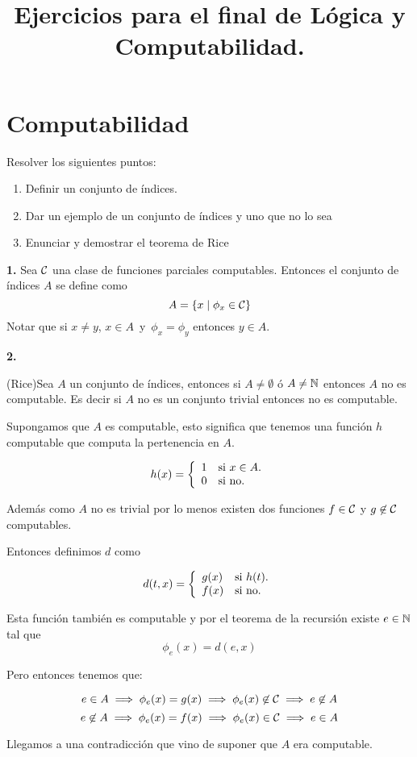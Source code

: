 \documentclass[leqno, 12pt, twoside,letterpaper]{book}
\title{Ejercicios para el final de Lógica y Computabilidad.}
\begin{document}
\maketitle
\tableofcontents
\chapter{Computabilidad}

\begin{ej}{13}
    Resolver los siguientes puntos:
    \begin{enumerate}
        \item Definir un conjunto de índices.
        \item Dar un ejemplo de un conjunto de índices y uno que no lo sea
        \item Enunciar y demostrar el teorema de Rice
    \end{enumerate}
\end{ej}

\begin{solucion}
\textbf{1.} Sea $\mathcal{C}$ una clase de funciones parciales computables. Entonces el conjunto de índices $A$ se define como
\[
	A = \{ x \mid \phi_{x} \in \mathcal{C} \}
\]
Notar que si $x \neq y$, $x \in A\,$ y $\,\phi_{x} = \phi_{y}$ entonces $y \in A$.

\noindent\textbf{2.}

\begin{teo}{ (Rice)}Sea $A$ un conjunto de índices, entonces si $A \neq \emptyset$ ó $A \neq \mathbb{N}$ entonces $A$ no es computable. Es decir si $A$ no es un conjunto trivial entonces no es computable.
\end{teo}

\begin{dem}
	Supongamos que $A$ es computable, esto significa que tenemos una función $h$ computable que computa la pertenencia en $A$.

	\[
	h(x) = \left\{ \begin{array}{ll} 1 & \mbox{si } x \in A. \\ 0 & \mbox{} \mbox{si no.} \end{array} \right.
	\]

	\noindent Además como $A$ no es trivial por lo menos existen dos funciones $f \in \mathcal{C}$ y $g \not\in \mathcal{C}$ computables.

	\noindent Entonces definimos $d$ como

	\[
		d(t, x) = \left\{ \begin{array}{ll} g(x) & \mbox{si } h(t). \\ f(x) & \mbox{} \mbox{si no.} \end{array} \right.
	\]

	\noindent Esta función también es computable y por el teorema de la recursión existe $e \in \mathbb{N}$ tal que
	\[
	\phi_{e}(x) = d(e, x)
	\]

	\noindent Pero entonces tenemos que:

	\[ e \in A \implies \phi_{e}(x) = g(x) \implies \phi_{e}(x) \not\in \mathcal{C} \implies e \not\in A\]
	\[ e \not\in A \implies \phi_{e}(x) = f(x) \implies \phi_{e}(x) \in \mathcal{C} \implies e \in A\]

	\noindent Llegamos a una contradicción que vino de suponer que $A$ era computable.

\end{dem}
\end{solucion}
\end{document}
